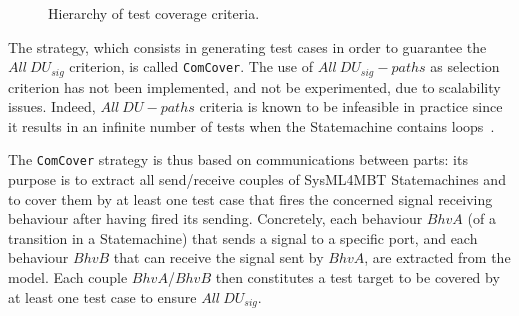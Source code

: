 \documentclass{llncs}
\begin{document}
\begin{figure}[htp]
	\centering
\vspace*{-.4cm}
\quad \quad \quad \quad
\vspace*{-.2cm}
\caption{Hierarchy of test coverage criteria.}
\label{newCriteria}
\vspace*{-.4cm}
\end{figure}


The strategy, which consists in generating test cases in order to
guarantee the $All~DU_{sig}$ criterion, is called \texttt{ComCover}. The use of $All~DU_{sig}-paths$ as selection criterion has
not been implemented, and not be experimented, due to scalability 
issues. Indeed, $All~DU-paths$ criteria is known to be infeasible in
practice since it results in an infinite number of tests when
the Statemachine contains loops~\cite{weiss10}.   

The \texttt{ComCover} strategy is thus based on communications
between parts: its purpose is to extract all send/receive couples of
SysML4MBT Statemachines and to cover them by at least one test case
that fires the concerned signal receiving behaviour after having fired
its sending. Concretely, each behaviour $BhvA$ (of a transition in a
Statemachine) that sends a signal to a specific port, and each
behaviour $BhvB$ that can receive the signal sent by $BhvA$, are
extracted from the model. Each couple $BhvA$/$BhvB$ then constitutes a
test target to be covered by at least one test case to ensure $All~DU_{sig}$. 
\vspace*{-.25cm}
\end{document}
